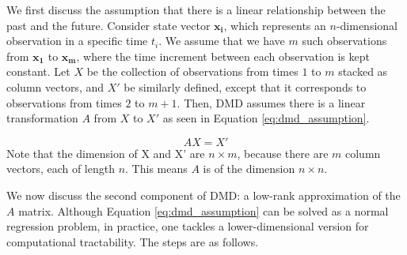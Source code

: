 \documentclass[letterpaper, 10 pt, conference]{ieeeconf}  %
\begin{document}
We first discuss the assumption that there is a linear relationship between the past and the future. Consider state vector $\bm{x_i}$, which represents an $n$-dimensional observation in a specific time $t_i$. We assume that we have $m$ such observations from $\bm{x_1}$ to $\bm{x_m}$, where the time increment between each observation is kept constant. Let $X$ be the collection of observations from times $1$ to $m$ stacked as column vectors, and $X'$ be similarly defined, except that it corresponds to observations from times $2$ to $m+1$. Then, DMD assumes there is a linear transformation $A$ from $X$ to $X'$ as seen in Equation \ref{eq:dmd_assumption}.

\begin{equation}
AX = X'
\label{eq:dmd_assumption}
\end{equation}
Note that the dimension of X and X' are $n \times m$, because there are $m$ column vectors, each of length $n$. This means $A$ is of the dimension $n \times n$.

We now discuss the second component of DMD: a low-rank approximation of the $A$ matrix. Although Equation \ref{eq:dmd_assumption} can be solved as a normal regression problem, in practice, one tackles a lower-dimensional version for computational tractability. The steps are as follows.
\end{document}
